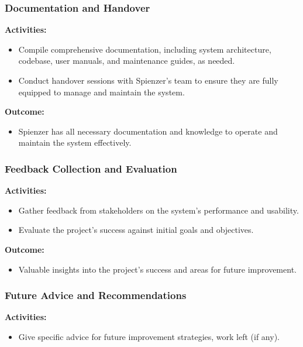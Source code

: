 \documentclass[12pt,a4paper]{article}
\begin{document}
\subsubsection{Documentation and Handover}

\noindent \textbf{Activities:}
\begin{itemize}
    \item Compile comprehensive documentation, including system architecture, codebase, user manuals, and maintenance guides, as needed.
    \item Conduct handover sessions with Spienzer's team to ensure they are fully equipped to manage and maintain the system.
\end{itemize}

\noindent \textbf{Outcome:}
\begin{itemize}
    \item Spienzer has all necessary documentation and knowledge to operate and maintain the system effectively.
\end{itemize}

\subsubsection{Feedback Collection and Evaluation}

\noindent \textbf{Activities:}
\begin{itemize}
    \item Gather feedback from stakeholders on the system's performance and usability.
    \item Evaluate the project's success against initial goals and objectives.
\end{itemize}

\noindent \textbf{Outcome:}
\begin{itemize}
    \item Valuable insights into the project's success and areas for future improvement.
\end{itemize}

\subsubsection{Future Advice and Recommendations}

\noindent \textbf{Activities:}
\begin{itemize}
    \item Give specific advice for future improvement strategies, work left (if any).
\end{itemize}
\end{document}

